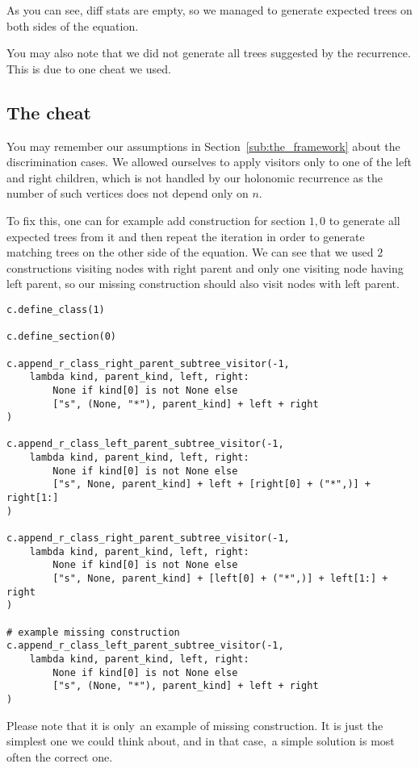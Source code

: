 \documentclass[final]{article}
\theoremstyle{definition}
\theoremstyle{definition}
\theoremstyle{remark}
\begin{document}
As you can see, diff stats are empty, so we managed to generate expected trees on both sides of the equation.

You may also note that we did not generate all trees suggested by the recurrence. This is due to one cheat we used.

\subsection{The cheat}%
\label{sub:the_cheat}

You may remember our assumptions in Section~\ref{sub:the_framework} about the discrimination cases. We allowed ourselves to apply visitors only to one of the left and right children, which is not handled by our holonomic recurrence as the number of such vertices does not depend only on \(n\).

To fix this, one can for example add construction for section \(1, 0\) to generate all expected trees from it and then repeat the iteration in order to generate matching trees on the other side of the equation. We can see that we used \(2\) constructions visiting nodes with right parent and only one visiting node having left parent, so our missing construction should also visit nodes with left parent.

\begin{lstlisting}
c.define_class(1)

c.define_section(0)

c.append_r_class_right_parent_subtree_visitor(-1,
    lambda kind, parent_kind, left, right:
        None if kind[0] is not None else
        ["s", (None, "*"), parent_kind] + left + right
)

c.append_r_class_left_parent_subtree_visitor(-1,
    lambda kind, parent_kind, left, right:
        None if kind[0] is not None else
        ["s", None, parent_kind] + left + [right[0] + ("*",)] + right[1:]
)

c.append_r_class_right_parent_subtree_visitor(-1,
    lambda kind, parent_kind, left, right:
        None if kind[0] is not None else
        ["s", None, parent_kind] + [left[0] + ("*",)] + left[1:] + right
)

# example missing construction
c.append_r_class_left_parent_subtree_visitor(-1,
    lambda kind, parent_kind, left, right:
        None if kind[0] is not None else
        ["s", (None, "*"), parent_kind] + left + right
)
\end{lstlisting}

Please note that it is only~an example of missing construction. It is just the simplest one we could think about, and in that case,~a simple solution is most often the correct one.
\end{document}
